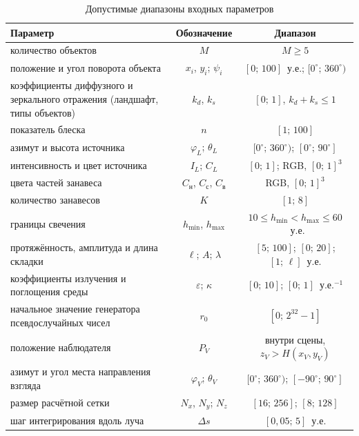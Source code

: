 \begin{table}[!ht]
	\caption{Допустимые диапазоны входных параметров}
	\label{tab:input-ranges}
	\begin{tabular}{|L{0.42}|C{0.22}|C{0.35}|}
		\hline
		Параметр & Обозначение & Диапазон \\
		\hline
		количество объектов & $M$ & $M \geqslant 5$ \\
		\hline
		положение и угол поворота объекта & $x_i$, $y_i$; $\psi_i$ & $[0;\,100]$~у.е.; $[0^\circ;\,360^\circ)$ \\
		\hline
		коэффициенты диффузного и зеркального отражения (ландшафт, типы объектов) & $k_d$, $k_s$ & $[0;\,1]$, $k_d + k_s \leqslant 1$ \\
		\hline
		показатель блеска & $n$ & $[1;\,100]$ \\
		\hline
		азимут и высота источника & $\varphi_L$; $\theta_L$ & $[0^\circ;\,360^\circ)$; $[0^\circ;\,90^\circ]$ \\
		\hline
		интенсивность и цвет источника & $I_L$; $C_L$ & $[0;\,1]$; RGB, $[0;\,1]^3$ \\
		\hline
		цвета частей занавеса & $C_{\text{н}}$, $C_{\text{с}}$, $C_{\text{в}}$ & RGB, $[0;\,1]^3$ \\
		\hline
		количество занавесов & $K$ & $[1;\,8]$ \\
		\hline
		границы свечения & $h_{\min}$, $h_{\max}$ & $10 \leqslant h_{\min} < h_{\max} \leqslant 60$~у.е. \\
		\hline
		протяжённость, амплитуда и длина складки & $\ell$; $A$; $\lambda$ & $[5;\,100]$; $[0;\,20]$; $[1;\,\ell]$~у.е. \\
		\hline
		коэффициенты излучения и поглощения среды & $\varepsilon$; $\kappa$ & $[0;\,10]$; $[0;\,1]$~у.е.$^{-1}$ \\
		\hline
		начальное значение генератора псевдослучайных чисел & $r_0$ & $[0;\,2^{32} - 1]$ \\
		\hline
		положение наблюдателя & $P_V$ & внутри сцены, $z_V > H(x_V, y_V)$ \\
		\hline
		азимут и угол места направления взгляда & $\varphi_V$; $\theta_V$ & $[0^\circ;\,360^\circ)$; $[-90^\circ;\,90^\circ]$ \\
		\hline
		размер расчётной сетки & $N_x$, $N_y$; $N_z$ & $[16;\,256]$; $[8;\,128]$ \\
		\hline
		шаг интегрирования вдоль луча & $\Delta s$ & $[0{,}05;\,5]$~у.е. \\
		\hline
	\end{tabular}
\end{table}

